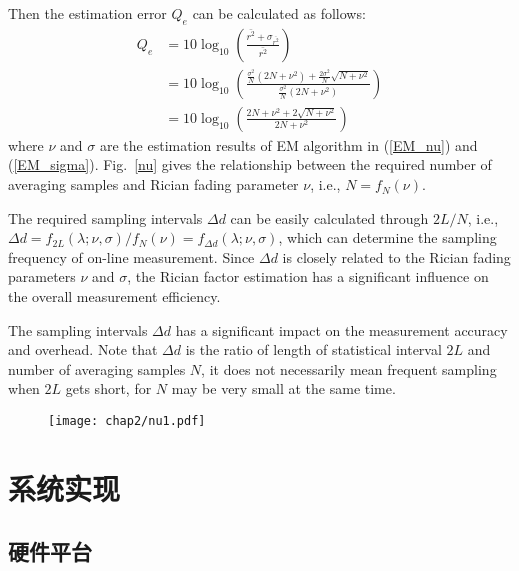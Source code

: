 Then the estimation error $Q_e$ can be calculated as follows:
\begin{equation}
\begin{split}
    Q_e&=10 \log_{10}\left(\frac{\bar{r^2}+\sigma_{\bar{r^2}}}{\bar{r^2}}\right)\\
    &=10 \log_{10}\left(\frac{\frac{\sigma^2}{N}\left(2N+\nu^2\right)+\frac{2\sigma^2}{N}\sqrt{N+\nu^2}}{\frac{\sigma^2}{N}(2N+\nu^2)}\right)\\
    &=10 \log_{10}\left(\frac{2N+\nu^2+2\sqrt{N+\nu^2}}{2N+\nu^2}\right)
\end{split}
\label{app:Q_e}
\end{equation}
where $\nu$ and $\sigma$ are the estimation results of EM algorithm in (\ref{EM_nu}) and (\ref{EM_sigma}). Fig.~\ref{nu} gives the relationship between the required number of averaging samples and Rician fading parameter $\nu$, i.e., $N=f_{N}(\nu)$.

The required sampling intervals $\Delta d$ can be easily calculated through $2L/N$, i.e., $\Delta d=f_{2L}(\lambda;\nu,\sigma)/f_{N}(\nu)=f_{\Delta d}(\lambda;\nu,\sigma)$, which can determine the sampling frequency of on-line measurement. Since $\Delta d$ is closely related to the Rician fading parameters $\nu$ and $\sigma$, the Rician factor estimation has a significant influence on the overall measurement efficiency.

The sampling intervals $\Delta d$ has a significant impact on the measurement accuracy and overhead. Note that $\Delta d$ is the ratio of length of statistical interval $2L$ and number of averaging samples $N$, it does not necessarily mean frequent sampling when $2L$ gets short, for $N$ may be very small at the same time.

\begin{figure}[!htp]
\centerline{
\texttt{[image: chap2/nu1.pdf]}
}
\end{figure}


\section{系统实现}
\label{sec:system_phy}

\subsection{硬件平台}
\label{sec:um}

